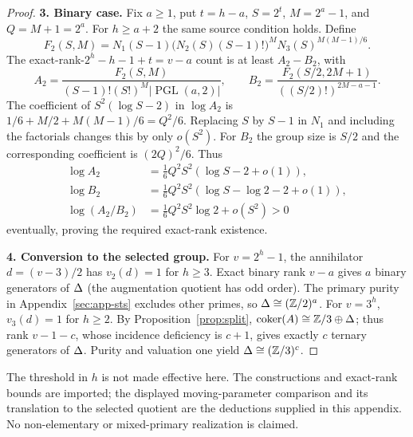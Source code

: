 \begin{proof}
\smallskip
\noindent\textbf{3. Binary case.} Fix $a\ge1$, put $t=h-a$, $S=2^t$, $M=2^a-1$,
and $Q=M+1=2^a$. For $h\ge a+2$ the same source condition holds. Define
\[
F_2(S,M)=N_1(S-1)\bigl(N_2(S)(S-1)!\bigr)^M
N_3(S)^{M(M-1)/6}.
\]
The exact-rank-$2^h-h-1+t=v-a$ count is at least $A_2-B_2$, with
\[
A_2=\frac{F_2(S,M)}{(S-1)!(S!)^M|\operatorname{PGL}(a,2)|},\qquad
B_2=\frac{F_2(S/2,2M+1)}{((S/2)!)^{2M-a-1}}.
\]
The coefficient of $S^2(\log S-2)$ in $\log A_2$ is
$1/6+M/2+M(M-1)/6=Q^2/6$. Replacing $S$ by $S-1$ in $N_1$ and
including the factorials changes this by only $o(S^2)$. For $B_2$ the group
size is $S/2$ and the corresponding coefficient is $(2Q)^2/6$. Thus
\begin{align*}
\log A_2&=\tfrac16Q^2S^2(\log S-2+o(1)),\\
\log B_2&=\tfrac16Q^2S^2(\log S-\log2-2+o(1)),\\
\log(A_2/B_2)&=\tfrac16Q^2S^2\log2+o(S^2)>0
\end{align*}
eventually, proving the required exact-rank existence.

\smallskip
\noindent\textbf{4. Conversion to the selected group.} For $v=2^h-1$, the annihilator
$d=(v-3)/2$ has $v_2(d)=1$ for $h\ge3$. Exact binary rank $v-a$ gives
$a$ binary generators of $\Delta$ (the augmentation quotient has odd order).
The primary purity in Appendix~\ref{sec:app-sts} excludes other primes,
so $\Delta\cong(\mathbb{Z}/2)^a$. For $v=3^h$, $v_3(d)=1$ for $h\ge2$.
By Proposition~\ref{prop:split},
$\operatorname{coker}(A)\cong\mathbb{Z}/3\oplus\Delta$; thus rank $v-1-c$, whose incidence
deficiency is $c+1$, gives exactly $c$ ternary generators of $\Delta$.
Purity and valuation one yield $\Delta\cong(\mathbb{Z}/3)^c$.
\end{proof}

The threshold in $h$ is not made effective here. The constructions and
exact-rank bounds are imported; the displayed moving-parameter comparison
and its translation to the selected quotient are the deductions supplied
in this appendix. No non-elementary or mixed-primary realization is claimed.
